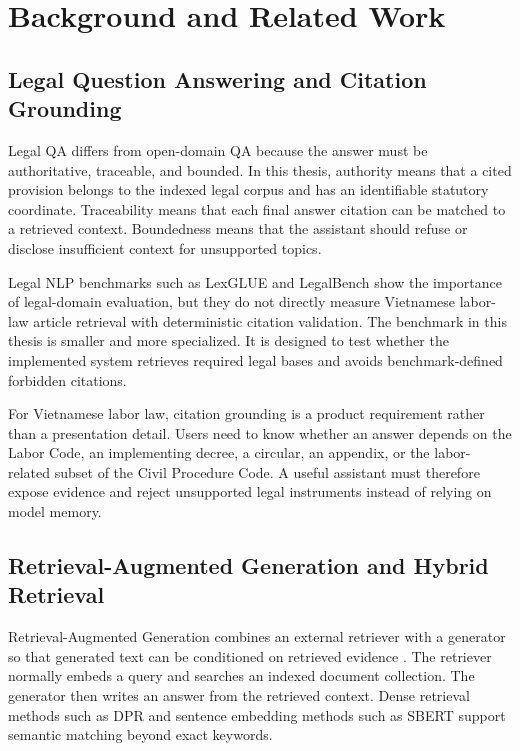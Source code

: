 \section{Background and Related Work}

\subsection{Legal Question Answering and Citation Grounding}
Legal QA differs from open-domain QA because the answer must be authoritative, traceable, and bounded. In this thesis, authority means that a cited provision belongs to the indexed legal corpus and has an identifiable statutory coordinate. Traceability means that each final answer citation can be matched to a retrieved context. Boundedness means that the assistant should refuse or disclose insufficient context for unsupported topics.

Legal NLP benchmarks such as LexGLUE \cite{chalkidis2021lexglue} and LegalBench \cite{guha2023legalbench} show the importance of legal-domain evaluation, but they do not directly measure Vietnamese labor-law article retrieval with deterministic citation validation. The benchmark in this thesis is smaller and more specialized. It is designed to test whether the implemented system retrieves required legal bases and avoids benchmark-defined forbidden citations.

For Vietnamese labor law, citation grounding is a product requirement rather than a presentation detail. Users need to know whether an answer depends on the Labor Code, an implementing decree, a circular, an appendix, or the labor-related subset of the Civil Procedure Code. A useful assistant must therefore expose evidence and reject unsupported legal instruments instead of relying on model memory.

\subsection{Retrieval-Augmented Generation and Hybrid Retrieval}
Retrieval-Augmented Generation combines an external retriever with a generator so that generated text can be conditioned on retrieved evidence \cite{lewis2020retrieval}. The retriever normally embeds a query and searches an indexed document collection. The generator then writes an answer from the retrieved context. Dense retrieval methods such as DPR \cite{karpukhin2020dense} and sentence embedding methods such as SBERT \cite{reimers2019sentencebert} support semantic matching beyond exact keywords.

